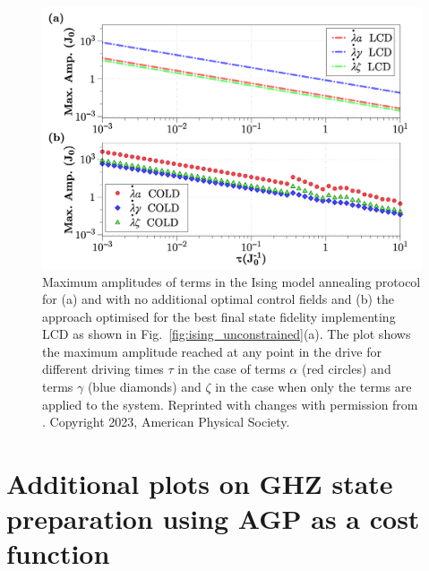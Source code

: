 \begin{figure}[t!]
    \centering
    \includegraphics[width=\linewidth]{images/MaxAmp.png} \caption[Plots of maximum amplitudes of LCD drives for the Ising spin chain.]{Maximum amplitudes of  terms in the Ising model annealing protocol for (a)  and   with no additional optimal control fields and (b) the  approach optimised for the best final state fidelity implementing  LCD as shown in Fig.~\ref{fig:ising_unconstrained}(a). The plot shows the maximum amplitude reached at any point in the drive for different driving times $\tau$ in the case of  terms $\alpha$ (red circles) and  terms $\gamma$ (blue diamonds) and $\zeta$ in the case when only the  terms are applied to the system. Reprinted with changes with permission from \cite{cepaite_counterdiabatic_2023}. Copyright 2023, American Physical Society.}\label{fig:ising_maxamp}
\end{figure}

\chapter{Additional plots on GHZ state preparation using AGP as a cost function}\label{app:higher_order_AGP}

